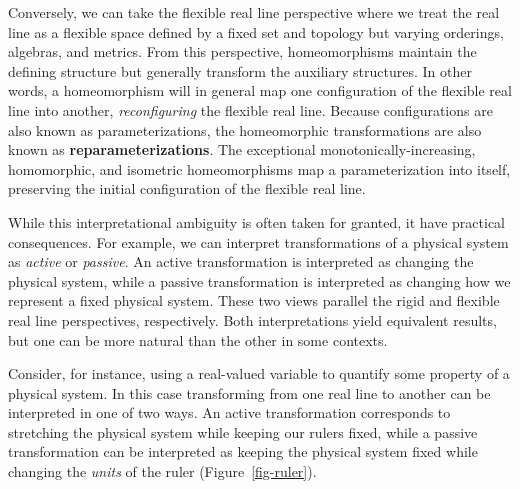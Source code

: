 \documentclass[
  letterpaper,
  DIV=11,
  numbers=noendperiod]{scrartcl}
\begin{document}
Conversely, we can take the flexible real line perspective where we
treat the real line as a flexible space defined by a fixed set and
topology but varying orderings, algebras, and metrics. From this
perspective, homeomorphisms maintain the defining structure but
generally transform the auxiliary structures. In other words, a
homeomorphism will in general map one configuration of the flexible real
line into another, \emph{reconfiguring} the flexible real line. Because
configurations are also known as parameterizations, the homeomorphic
transformations are also known as \textbf{reparameterizations}. The
exceptional monotonically-increasing, homomorphic, and isometric
homeomorphisms map a parameterization into itself, preserving the
initial configuration of the flexible real line.

While this interpretational ambiguity is often taken for granted, it
have practical consequences. For example, we can interpret
transformations of a physical system as \emph{active} or \emph{passive}.
An active transformation is interpreted as changing the physical system,
while a passive transformation is interpreted as changing how we
represent a fixed physical system. These two views parallel the rigid
and flexible real line perspectives, respectively. Both interpretations
yield equivalent results, but one can be more natural than the other in
some contexts.

Consider, for instance, using a real-valued variable to quantify some
property of a physical system. In this case transforming from one real
line to another can be interpreted in one of two ways. An active
transformation corresponds to stretching the physical system while
keeping our rulers fixed, while a passive transformation can be
interpreted as keeping the physical system fixed while changing the
\emph{units} of the ruler (Figure~\ref{fig-ruler}).
\end{document}
